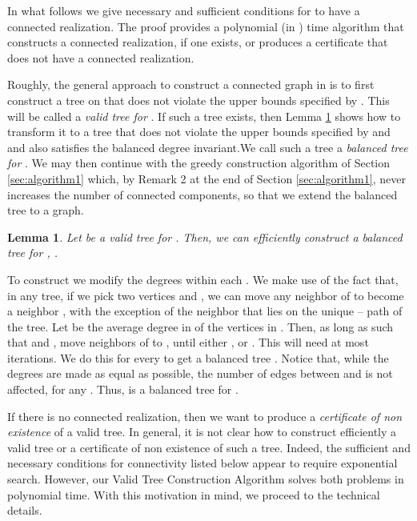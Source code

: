 \documentclass[12pt,a4paper]{article}
\theoremstyle{definition}
\theoremstyle{plain}
\newtheorem{lemma}[dfn]{Lemma}
\newenvironment{prf}{\noindent {\bf Proof.}}{\begin{flushright}\vspace{-2em}\footnotesize\normalsize\end{flushright}\smallskip}
\begin{document}
In what follows we 
give  necessary and sufficient conditions
for  to have a connected realization.
The proof provides a polynomial (in ) time algorithm that constructs a
connected realization, if one exists,
or produces a certificate that  does not have
a connected realization.

Roughly, the general approach to construct
a connected graph in  is to first construct a tree
on 
that does not violate the upper bounds specified by .
This will be called a \emph{{valid tree for}} .
If such a tree exists, then Lemma \ref{lem:3-1} shows how to transform it to a tree
that does not violate the upper bounds specified by  and   and also 
satisfies the balanced degree invariant.We call such a tree a \emph{balanced tree for}
.
We may then continue with the greedy construction algorithm 
of Section \ref{sec:algorithm1} which,
by Remark 2 at the end of Section \ref{sec:algorithm1}, 
never increases the number of connected components, so that we extend the balanced tree
to a  graph.
\begin{lemma}
\label{lem:3-1}
Let  be a valid tree for  .
Then, we can efficiently construct a balanced tree for ,
 .
\end{lemma}
\begin{prf}
To construct  we modify the degrees within each . 
We make use of the
fact that, in any tree, if we pick two vertices  and , we can
move any neighbor of  to become a neighbor , with the exception
of the neighbor that lies on the unique -- path of the tree. Let
 be the average degree in  of the vertices in
. 
Then, as long as
 such that 
 and ,
move neighbors of  to , until either , or
. 
This will need at most
 iterations. We do this for every  to get a balanced 
tree .
Notice that, while the degrees are made as equal as possible, the
number of edges between  and  is not affected, for any .
Thus,  is a balanced tree for .
\end{prf}

If there is no connected realization, then we want to produce a
{\it certificate of non existence} of a valid tree.
In general, it is not clear how to construct efficiently a valid tree
or a certificate of non existence of such a tree.
Indeed, the sufficient and necessary conditions for connectivity
listed below appear to require exponential search.
However, our Valid Tree Construction Algorithm
solves both problems in polynomial time.
With this motivation in mind, we proceed to the technical details.
\end{document}
